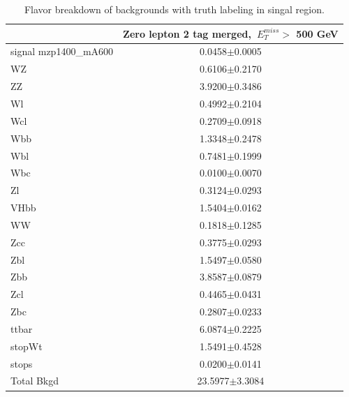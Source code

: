 \begin{table}
    \centering
    \tiny
    \begin{tabular}{l|c|}
    \cline{2-2} & \multicolumn{1}{c|}{Zero lepton 2 tag merged,~$E_{T}^{miss}$$ >$ 500 GeV} \\
    \hline
    signal mzp1400\_mA600 & 0.0458$\pm$0.0005 \\
    \hline
    WZ    & 0.6106$\pm$0.2170 \\
    ZZ    & 3.9200$\pm$0.3486 \\
    Wl    & 0.4992$\pm$0.2104 \\
    Wcl   & 0.2709$\pm$0.0918 \\
    Wbb   & 1.3348$\pm$0.2478 \\
    Wbl   & 0.7481$\pm$0.1999 \\
    Wbc   & 0.0100$\pm$0.0070 \\
    Zl    & 0.3124$\pm$0.0293 \\
    VHbb  & 1.5404$\pm$0.0162 \\
    WW    & 0.1818$\pm$0.1285 \\
    Zcc   & 0.3775$\pm$0.0293 \\
    Zbl   & 1.5497$\pm$0.0580 \\
    Zbb   & 3.8587$\pm$0.0879 \\
    Zcl   & 0.4465$\pm$0.0431 \\
    Zbc   & 0.2807$\pm$0.0233 \\
    ttbar & 6.0874$\pm$0.2225 \\
    stopWt& 1.5491$\pm$0.4528 \\
    stops & 0.0200$\pm$0.0141 \\
    \hline
    Total Bkgd & 23.5977$\pm$3.3084 \\
    \hline
    \end{tabular}
    \caption{Flavor breakdown of backgrounds with truth labeling in singal region.}
    \label{tab:fl0}
\end{table}

